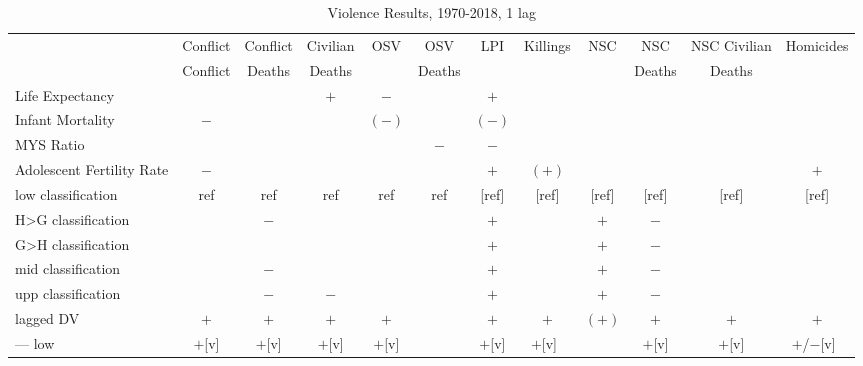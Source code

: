 \documentclass[12pt]{article}
\begin{document}
\begin{table}
\small
\centering
\caption{Violence Results, 1970-2018, 1 lag}
\label{table_violence}
\begin{tabular}{lccccccccccc}
\toprule
                          & Conflict     & Conflict & Civilian & OSV    & OSV    & LPI    & Killings & NSC      & NSC      & NSC Civilian & Homicides \\
                          & Conflict     & Deaths   & Deaths   &        & Deaths &        &          &          & Deaths   & Deaths       & \\
\midrule
Life Expectancy           &              &          & $+$      & $-$    &        & $+$    &          &          &          &              & \\
Infant Mortality          & $-$          &          &          & $(-)$  &        & $(-)$  &          &          &          &              & \\
MYS Ratio                 &              &          &          &        & $-$    & $-$    &          &          &          &              & \\
Adolescent Fertility Rate & $-$          &          &          &        &        & $+$    & $(+)$    &          &          &              & $+$ \\
low classification        & ref          & ref      & ref      & ref    & ref    & [ref]  & [ref]    & [ref]    & [ref]    & [ref]        & [ref] \\
H>G classification        &              & $-$      &          &        &        & $+$    &          & $+$      & $-$      &              & \\
G>H classification        &              &          &          &        &        & $+$    &          & $+$      & $-$      &              & \\
mid classification        &              & $-$      &          &        &        & $+$    &          & $+$      & $-$      &              & \\
upp classification        &              & $-$      & $-$      &        &        & $+$    &          & $+$      & $-$      &              & \\
lagged DV                 & $+$          & $+$      & $+$      & $+$    &        & $+$    & $+$      & $(+)$    & $+$      & $+$          & $+$ \\
--- low                   & $+$[v]       & $+$[v]   & $+$[v]   & $+$[v] &        & $+$[v] & $+$[v]~  &          & $+$[v]   & $+$[v]       & $+$/$-$[v]~ \\

\end{tabular}
\end{table}
\end{document}
